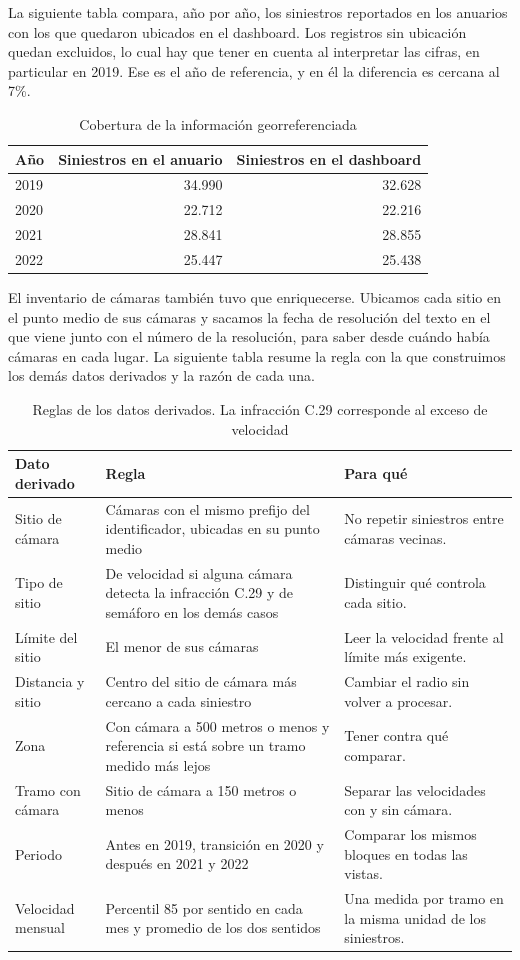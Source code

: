 \documentclass[10pt,a4paper]{article}
\begin{document}
La siguiente tabla compara, año por año, los siniestros reportados en los anuarios con los que quedaron ubicados en el dashboard. Los registros sin ubicación quedan excluidos, lo cual hay que tener en cuenta al interpretar las cifras, en particular en 2019. Ese es el año de referencia, y en él la diferencia es cercana al 7\%.

\begin{table}[!htbp]\centering\small
\begin{tabular}{lrr}
\toprule
\textbf{Año} & \textbf{Siniestros en el anuario} & \textbf{Siniestros en el dashboard}\\
\midrule
2019 & 34.990 & 32.628\\
2020 & 22.712 & 22.216\\
2021 & 28.841 & 28.855\\
2022 & 25.447 & 25.438\\
\bottomrule
\end{tabular}
\caption{Cobertura de la información georreferenciada}
\end{table}

El inventario de cámaras también tuvo que enriquecerse. Ubicamos cada sitio en el punto medio de sus cámaras y sacamos la fecha de resolución del texto en el que viene junto con el número de la resolución, para saber desde cuándo había cámaras en cada lugar. La siguiente tabla resume la regla con la que construimos los demás datos derivados y la razón de cada una.

\begin{table}[H]\centering\small
\begin{tabularx}{\linewidth}{P{3.4cm}P{6.2cm}L}
\toprule
\textbf{Dato derivado} & \textbf{Regla} & \textbf{Para qué}\\
\midrule
Sitio de cámara & Cámaras con el mismo prefijo del identificador, ubicadas en su punto medio & No repetir siniestros entre cámaras vecinas.\\
Tipo de sitio & De velocidad si alguna cámara detecta la infracción C.29 y de semáforo en los demás casos & Distinguir qué controla cada sitio.\\
Límite del sitio & El menor de sus cámaras & Leer la velocidad frente al límite más exigente.\\
Distancia y sitio & Centro del sitio de cámara más cercano a cada siniestro & Cambiar el radio sin volver a procesar.\\
Zona & Con cámara a 500 metros o menos y referencia si está sobre un tramo medido más lejos & Tener contra qué comparar.\\
Tramo con cámara & Sitio de cámara a 150 metros o menos & Separar las velocidades con y sin cámara.\\
Periodo & Antes en 2019, transición en 2020 y después en 2021 y 2022 & Comparar los mismos bloques en todas las vistas.\\
Velocidad mensual & Percentil 85 por sentido en cada mes y promedio de los dos sentidos & Una medida por tramo en la misma unidad de los siniestros.\\
\bottomrule
\end{tabularx}
\caption{Reglas de los datos derivados. La infracción C.29 corresponde al exceso de velocidad}
\end{table}
\end{document}
